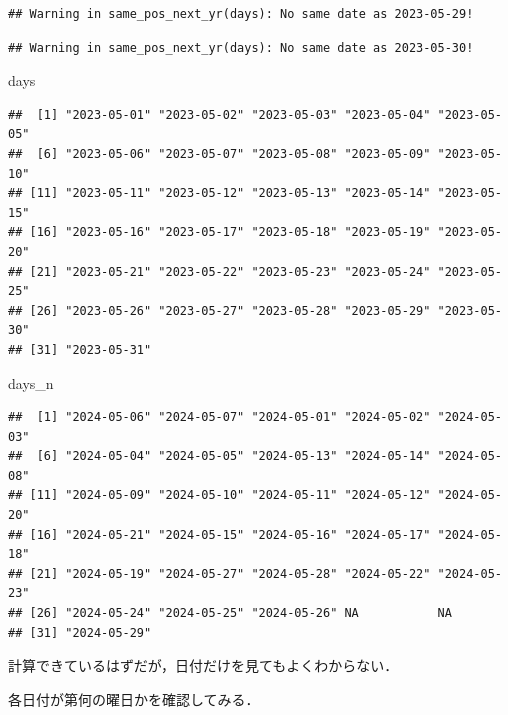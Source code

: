 \documentclass[
]{article}
\newenvironment{Shaded}{\begin{snugshade}}{\end{snugshade}}
\newcommand{\NormalTok}[1]{#1}
\begin{document}
\begin{verbatim}
## Warning in same_pos_next_yr(days): No same date as 2023-05-29!
\end{verbatim}

\begin{verbatim}
## Warning in same_pos_next_yr(days): No same date as 2023-05-30!
\end{verbatim}

\begin{Shaded}
\begin{Highlighting}[]
\NormalTok{days}
\end{Highlighting}
\end{Shaded}

\begin{verbatim}
##  [1] "2023-05-01" "2023-05-02" "2023-05-03" "2023-05-04" "2023-05-05"
##  [6] "2023-05-06" "2023-05-07" "2023-05-08" "2023-05-09" "2023-05-10"
## [11] "2023-05-11" "2023-05-12" "2023-05-13" "2023-05-14" "2023-05-15"
## [16] "2023-05-16" "2023-05-17" "2023-05-18" "2023-05-19" "2023-05-20"
## [21] "2023-05-21" "2023-05-22" "2023-05-23" "2023-05-24" "2023-05-25"
## [26] "2023-05-26" "2023-05-27" "2023-05-28" "2023-05-29" "2023-05-30"
## [31] "2023-05-31"
\end{verbatim}

\begin{Shaded}
\begin{Highlighting}[]
\NormalTok{days\_n}
\end{Highlighting}
\end{Shaded}

\begin{verbatim}
##  [1] "2024-05-06" "2024-05-07" "2024-05-01" "2024-05-02" "2024-05-03"
##  [6] "2024-05-04" "2024-05-05" "2024-05-13" "2024-05-14" "2024-05-08"
## [11] "2024-05-09" "2024-05-10" "2024-05-11" "2024-05-12" "2024-05-20"
## [16] "2024-05-21" "2024-05-15" "2024-05-16" "2024-05-17" "2024-05-18"
## [21] "2024-05-19" "2024-05-27" "2024-05-28" "2024-05-22" "2024-05-23"
## [26] "2024-05-24" "2024-05-25" "2024-05-26" NA           NA          
## [31] "2024-05-29"
\end{verbatim}

計算できているはずだが，日付だけを見てもよくわからない．

各日付が第何の曜日かを確認してみる．
\end{document}
